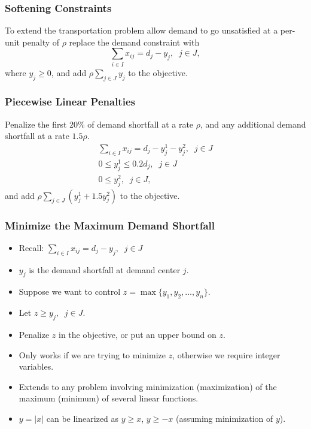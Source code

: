 \documentclass[12pt,handout]{beamer}
\begin{document}
\begin{frame}
\frametitle{Softening Constraints}
To extend the transportation problem allow demand to go unsatisfied at a per-unit penalty of $\rho$ replace the demand constraint with
\begin{equation}
\sum_{i \in I} x_{ij} = d_j - y_j,\;\;j \in J, \nonumber
\end{equation}
\noindent where $y_j \ge 0$, and add $\rho \sum_{j \in J} y_j$ to the objective.
\end{frame}

\begin{frame}
\frametitle{Piecewise Linear Penalties}
Penalize the first 20\% of demand shortfall at a rate $\rho$, and any additional demand shortfall at a rate $1.5\rho$.
\begin{eqnarray}
\sum_{i \in I} x_{ij} = d_j - y_j^1 - y_j^2,\;\;j \in J \nonumber \\
0 \le y_j^1 \le 0.2d_j,\;\;j \in J \nonumber \\
0 \le y_j^2,\;\;j \in J, \nonumber
\end{eqnarray}
\noindent and add $\rho \sum_{j \in J} (y_j^1 + 1.5 y_j^2)$ to the objective.
\end{frame}


\begin{frame}
\frametitle{Minimize the Maximum Demand Shortfall}
\begin{itemize}
\item Recall: $\sum_{i \in I} x_{ij} = d_j - y_j,\;\;j \in J$
\item $y_j$ is the demand shortfall at demand center $j$.
\item Suppose we want to control $z = \max \{y_1, y_2, \ldots, y_n\}$.
\item Let $z \ge y_j,\;\;j \in J$.
\item Penalize $z$ in the objective, or put an upper bound on $z$.
\item Only works if we are trying to minimize $z$, otherwise we require integer variables.
\item Extends to any problem involving minimization (maximization) of the maximum (minimum) of several linear functions.
\item $y = |x|$ can be linearized as $y \ge x$, $y \ge -x$ (assuming minimization of $y$).
\end{itemize}
\end{frame}
\end{document}
